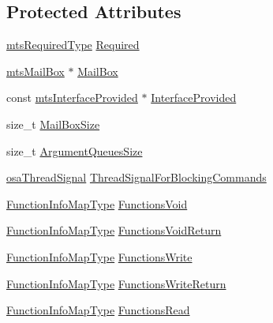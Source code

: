 \subsection*{Protected Attributes}
\begin{DoxyCompactItemize}
\item 
\hyperlink{mts_forward_declarations_8h_a9ef1ce54724afde7802db326ff8606f3}{mts\-Required\-Type} \hyperlink{classmts_interface_required_afab8d38a3a48765ecdf8d4349521f01e}{Required}
\item 
\hyperlink{classmts_mail_box}{mts\-Mail\-Box} $\ast$ \hyperlink{classmts_interface_required_a449f33d73348d11900eead13f009b89c}{Mail\-Box}
\item 
const \hyperlink{classmts_interface_provided}{mts\-Interface\-Provided} $\ast$ \hyperlink{classmts_interface_required_a9c35d946a1e0308d32495e94ba90978e}{Interface\-Provided}
\item 
size\-\_\-t \hyperlink{classmts_interface_required_a7e9f87dc80d231cab9df4bb446df964a}{Mail\-Box\-Size}
\item 
size\-\_\-t \hyperlink{classmts_interface_required_a4a401b5a34386931fc8378cb42fccf5b}{Argument\-Queues\-Size}
\item 
\hyperlink{classosa_thread_signal}{osa\-Thread\-Signal} \hyperlink{classmts_interface_required_a99419345347d51f917ed98a270ce9366}{Thread\-Signal\-For\-Blocking\-Commands}
\item 
\hyperlink{classmts_interface_required_a4c21eaf53811c5782bae6293904cffe5}{Function\-Info\-Map\-Type} \hyperlink{classmts_interface_required_ab2250cb695e1b187d6b4bbcc3a6cd73d}{Functions\-Void}
\item 
\hyperlink{classmts_interface_required_a4c21eaf53811c5782bae6293904cffe5}{Function\-Info\-Map\-Type} \hyperlink{classmts_interface_required_a0588d79b2eca17da7ab9dfe9be6464f1}{Functions\-Void\-Return}
\item 
\hyperlink{classmts_interface_required_a4c21eaf53811c5782bae6293904cffe5}{Function\-Info\-Map\-Type} \hyperlink{classmts_interface_required_af065f884f6aaac85d342b49bf6673528}{Functions\-Write}
\item 
\hyperlink{classmts_interface_required_a4c21eaf53811c5782bae6293904cffe5}{Function\-Info\-Map\-Type} \hyperlink{classmts_interface_required_a4ce7797bea9968322e404e09a289196f}{Functions\-Write\-Return}
\item 
\hyperlink{classmts_interface_required_a4c21eaf53811c5782bae6293904cffe5}{Function\-Info\-Map\-Type} \hyperlink{classmts_interface_required_a0bbaaa1a252a893b921a02c61febf597}{Functions\-Read}

\end{DoxyCompactItemize}

